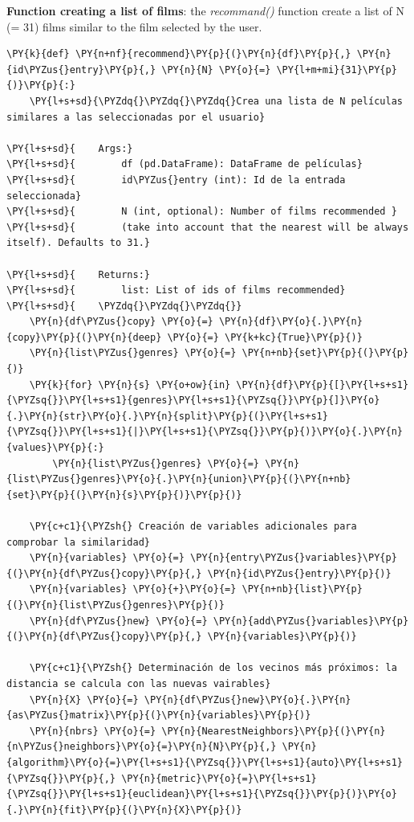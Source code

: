     \textbf{Function creating a list of films}: the \emph{recommand()}
function create a list of N (= 31) films similar to the film selected by
the user.

    \begin{tcolorbox}[breakable, size=fbox, boxrule=1pt, pad at break*=1mm,colback=cellbackground, colframe=cellborder]
\begin{Verbatim}[commandchars=\\\{\}]
\PY{k}{def} \PY{n+nf}{recommend}\PY{p}{(}\PY{n}{df}\PY{p}{,} \PY{n}{id\PYZus{}entry}\PY{p}{,} \PY{n}{N} \PY{o}{=} \PY{l+m+mi}{31}\PY{p}{)}\PY{p}{:}
    \PY{l+s+sd}{\PYZdq{}\PYZdq{}\PYZdq{}Crea una lista de N películas similares a las seleccionadas por el usuario}

\PY{l+s+sd}{    Args:}
\PY{l+s+sd}{        df (pd.DataFrame): DataFrame de películas}
\PY{l+s+sd}{        id\PYZus{}entry (int): Id de la entrada seleccionada}
\PY{l+s+sd}{        N (int, optional): Number of films recommended }
\PY{l+s+sd}{        (take into account that the nearest will be always itself). Defaults to 31.}

\PY{l+s+sd}{    Returns:}
\PY{l+s+sd}{        list: List of ids of films recommended}
\PY{l+s+sd}{    \PYZdq{}\PYZdq{}\PYZdq{}}
    \PY{n}{df\PYZus{}copy} \PY{o}{=} \PY{n}{df}\PY{o}{.}\PY{n}{copy}\PY{p}{(}\PY{n}{deep} \PY{o}{=} \PY{k+kc}{True}\PY{p}{)}    
    \PY{n}{list\PYZus{}genres} \PY{o}{=} \PY{n+nb}{set}\PY{p}{(}\PY{p}{)}
    \PY{k}{for} \PY{n}{s} \PY{o+ow}{in} \PY{n}{df}\PY{p}{[}\PY{l+s+s1}{\PYZsq{}}\PY{l+s+s1}{genres}\PY{l+s+s1}{\PYZsq{}}\PY{p}{]}\PY{o}{.}\PY{n}{str}\PY{o}{.}\PY{n}{split}\PY{p}{(}\PY{l+s+s1}{\PYZsq{}}\PY{l+s+s1}{|}\PY{l+s+s1}{\PYZsq{}}\PY{p}{)}\PY{o}{.}\PY{n}{values}\PY{p}{:}
        \PY{n}{list\PYZus{}genres} \PY{o}{=} \PY{n}{list\PYZus{}genres}\PY{o}{.}\PY{n}{union}\PY{p}{(}\PY{n+nb}{set}\PY{p}{(}\PY{n}{s}\PY{p}{)}\PY{p}{)}    

    \PY{c+c1}{\PYZsh{} Creación de variables adicionales para comprobar la similaridad}
    \PY{n}{variables} \PY{o}{=} \PY{n}{entry\PYZus{}variables}\PY{p}{(}\PY{n}{df\PYZus{}copy}\PY{p}{,} \PY{n}{id\PYZus{}entry}\PY{p}{)}
    \PY{n}{variables} \PY{o}{+}\PY{o}{=} \PY{n+nb}{list}\PY{p}{(}\PY{n}{list\PYZus{}genres}\PY{p}{)}
    \PY{n}{df\PYZus{}new} \PY{o}{=} \PY{n}{add\PYZus{}variables}\PY{p}{(}\PY{n}{df\PYZus{}copy}\PY{p}{,} \PY{n}{variables}\PY{p}{)}

    \PY{c+c1}{\PYZsh{} Determinación de los vecinos más próximos: la distancia se calcula con las nuevas vairables}
    \PY{n}{X} \PY{o}{=} \PY{n}{df\PYZus{}new}\PY{o}{.}\PY{n}{as\PYZus{}matrix}\PY{p}{(}\PY{n}{variables}\PY{p}{)}
    \PY{n}{nbrs} \PY{o}{=} \PY{n}{NearestNeighbors}\PY{p}{(}\PY{n}{n\PYZus{}neighbors}\PY{o}{=}\PY{n}{N}\PY{p}{,} \PY{n}{algorithm}\PY{o}{=}\PY{l+s+s1}{\PYZsq{}}\PY{l+s+s1}{auto}\PY{l+s+s1}{\PYZsq{}}\PY{p}{,} \PY{n}{metric}\PY{o}{=}\PY{l+s+s1}{\PYZsq{}}\PY{l+s+s1}{euclidean}\PY{l+s+s1}{\PYZsq{}}\PY{p}{)}\PY{o}{.}\PY{n}{fit}\PY{p}{(}\PY{n}{X}\PY{p}{)}


\end{Verbatim}
\end{tcolorbox}
